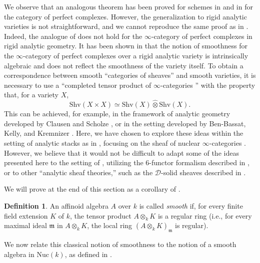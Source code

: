 \documentclass[oneside, hidelinks, 12pt, a4paper,reqno]{amsart}
\theoremstyle{plain}
\theoremstyle{definition}
\newtheorem{definition}[definition]{Definition}
\theoremstyle{plain}
\newcommand{\cat}{$\infty$-category }
\newcommand{\cates}{$\infty$-categories }
\newcommand{\Nuc}{\mathrm{Nuc}}
\begin{document}
We observe that an analogous theorem has been proved for schemes in \cite{Orlov_2016noncommutativeschemes} and in \cite{lunts2009categoricalresolutionsingularities} for the category of perfect complexes. However, the generalization to rigid analytic varieties is not straightforward, and we cannot reproduce the same proof as in \cite{Orlov_2016noncommutativeschemes}. Indeed, the analogue of  does not hold for the \cat of perfect complexes in rigid analytic geometry. It has been shown in \cite{montagnani2025algebraizationrigidanalyticvarieties} that the notion of smoothness for the \cat of perfect complexes over a rigid analytic variety is intrinsically algebraic and does not reflect the smoothness of the variety itself. To obtain a correspondence between smooth ``categories of sheaves'' and smooth varieties, it is necessary to use a ``completed tensor product of \cates'' with the property that, for a variety $X$,
\[
\mathrm{Shv}(X\times X) \simeq \mathrm{Shv}(X)\widehat\otimes\mathrm{Shv}(X).
\]
This can be achieved, for example, in the framework of analytic geometry developed by Clausen and Scholze \cite{Clausen_Scholze_lectures}, or in the setting developed by Ben-Bassat, Kelly, and Kremnizer \cite{benbassat2024perspectivefoundationsderivedanalytic}. Here, we have chosen to explore these ideas within the setting of analytic stacks as in \cite{Clausen_Scholze_lectures}, focusing on the sheaf of nuclear \cates. However, we believe that it would not be difficult to adapt some of the ideas presented here to the setting of \cite{benbassat2024perspectivefoundationsderivedanalytic}, utilizing the $6$-functor formalism described in \cite{soor2025sixfunctorformalismquasicoherentsheaves}, or to other ``analytic sheaf theories,'' such as the $\mathscr{D}$-solid sheaves described in \cite{camargo2024analyticrhamstackrigid}.

We will prove  at the end of this section as a corollary of .

\begin{definition}\label{def:smoothAffinoid}
    An affinoid algebra $A$ over $k$ is called \emph{smooth} if, for every finite field extension $K$ of $k$, the tensor product $A\otimes_{k}K$ is a regular ring (i.e., for every maximal ideal $\mathfrak{m}$ in $A\otimes_{k}K$, the local ring $(A\otimes_{k}K)_{\mathfrak{m}}$ is regular). 
\end{definition}

We now relate this classical notion of smoothness to the notion of a smooth algebra in $\Nuc(k)$, as defined in .
\end{document}
